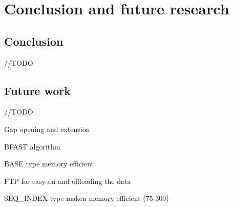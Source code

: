 
\chapter{Conclusion and future research}

\section{Conclusion}

//TODO

\section{Future work}

//TODO

Gap opening and extension

BFAST algorithm

BASE type memory efficient

FTP for easy on and offloading the data

SEQ\_INDEX type maken memory efficient (75-300)